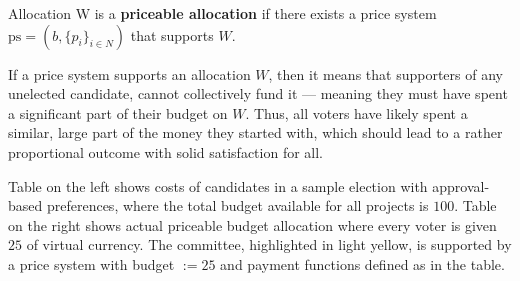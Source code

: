 \begin{definition}
    Allocation W is a \textbf{priceable allocation} if there exists a price system $\text{ps}=(b, \{p_i\}_{i\in N})$ that supports $W$.
\end{definition}
If a price system supports an allocation $W$, then it means that supporters of any unelected candidate, cannot collectively fund it --- meaning they must have spent a significant part of their budget on $W$. Thus, all voters have likely spent a similar, large part of the money they started with, which should lead to a rather proportional outcome with solid satisfaction for all.
\begin{example}
Table on the left shows costs of candidates in a sample election with approval-based preferences, where the total budget available for all projects is $100$. Table on the right shows actual priceable budget allocation where every voter is given $25$ of virtual currency. The committee, highlighted in light yellow, is supported by a price system with budget $:= 25$ and payment functions defined as in the table.


\end{example}
